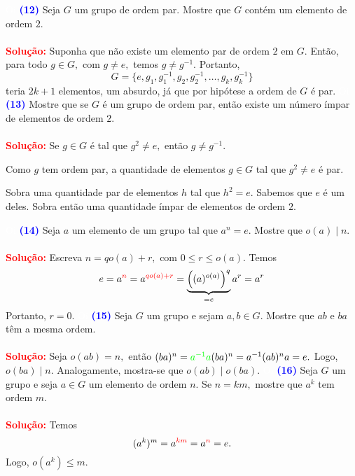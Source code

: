 \documentclass[12pt, a4paper]{article}
\begin{document}
\textcolor{white}{Oi}\newline\newline
\textcolor{blue}{\bf(12)}\label{20} Seja $G$ um grupo de ordem par. Mostre que $G$ contém um elemento de ordem $2.$\\ \\ 
\textbf{\textcolor{red}{Solução:}} Suponha que não existe um elemento par de ordem $2$ em $G.$ Então, para todo $g \in G,$ com $g \neq e,$ temos $g \neq g^{-1}.$ Portanto,
\[
G = \{e, g_1, g_1^{-1}, g_2, g_2^{-1}, \ldots, g_k, g_k^{-1} \}
\]
teria $2k+1$ elementos, um absurdo, já que por hipótese a ordem de $G$ é par.
\textcolor{white}{Oi}\newline\newline
\textcolor{blue}{\bf(13)}\label{21} Mostre que se $G$ é um grupo de ordem par, então existe um número ímpar de elementos de ordem $2.$\\ \\ 
\textbf{\textcolor{red}{Solução:}} Se $g \in G$ é tal que $g^2 \neq e,$ então $g \neq g^{-1}.$

Como $g$ tem ordem par, a quantidade de elementos $g \in G$ tal que $g^2 \neq e$ é par.

Sobra uma quantidade par de elementos $h$ tal que $h^2 = e.$
Sabemos que $e$ é um deles. Sobra então uma quantidade ímpar de elementos de ordem $2.$

\textcolor{white}{Oi}\newline\newline
\textcolor{blue}{\bf(14)}\label{22} Seja $a$ um elemento de um grupo tal que $a^n = e.$ Mostre que $o(a) \mid n.$\\ \\ 

\textbf{\textcolor{red}{Solução:}} Escreva $n = q o(a) + r,$ com $0 \le r \le o(a).$ Temos
\[
e = a^{\textcolor{red}{n}} = a^{\textcolor{red}{ q o(a) + r}} = \underbrace{\left((a)^{o(a)}\right)^{q}}_{=e} a^r = a^r
\]
Portanto, $r = 0.$
\textcolor{white}{Oi}\newline\newline
\textcolor{blue}{\bf(15)}\label{23} Seja $G$ um grupo e sejam $a,b \in G.$ Mostre que $ab$ e $ba$ têm a mesma ordem.\\ \\ 
\textbf{\textcolor{red}{Solução:}} Seja $o(ab) = n,$ então $(ba)^n = \textcolor{green}{a^{-1}a}(ba)^n = a^{-1}(ab)^n a = e.$
Logo, $o(ba) \mid n.$ Analogamente, mostra-se que $o(ab) \mid o(ba).$
\textcolor{white}{Oi}\newline\newline
\textcolor{blue}{\bf(16)}\label{24} Seja $G$ um grupo e seja $a \in G$ um elemento de ordem $n.$ Se $n = km,$ mostre que $a^k$ tem ordem $m.$\\ \\ 
\textbf{\textcolor{red}{Solução:}} Temos
\[(a^k)^m = a^{\textcolor{red}{km}} = a^{\textcolor{red}{n}} = e.
\]
Logo, $o(a^k) \le m.$
\end{document}
